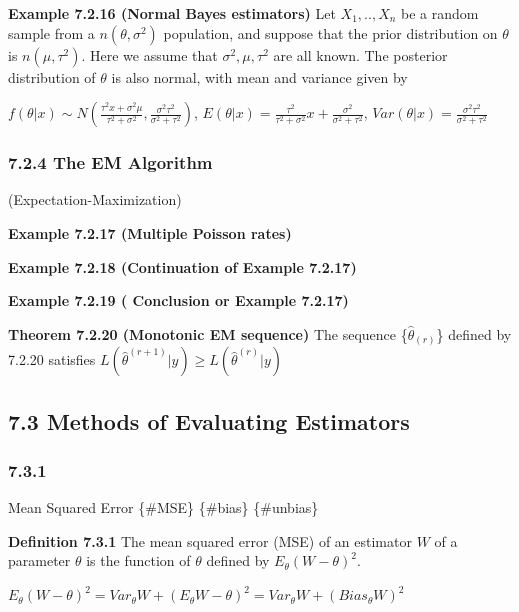 \documentclass[10pt,twocolumn,portrait]{article}
\begin{document}
\textbf{Example 7.2.16 (Normal Bayes estimators)} Let \(X_1,..,X_n\) be
a random sample from a \(n(\theta,\sigma^2)\) population, and suppose
that the prior distribution on \(\theta\) is \(n(\mu,\tau^2)\). Here we
assume that \(\sigma^2, \mu, \tau^2\) are all known. The posterior
distribution of \(\theta\) is also normal, with mean and variance given
by

\(f(\theta|x)\sim N(\frac{\tau^2x+\sigma^2\mu}{\tau^2+\sigma^2},\frac{\sigma^2\tau^2}{\sigma^2+\tau^2})\),
\(E(\theta|x)=\frac{\tau^2}{\tau^2+\sigma^2}x+\frac{\sigma^2}{\sigma^2+\tau^2}\),
\(Var(\theta|x)=\frac{\sigma^2\tau^2}{\sigma^2+\tau^2}\)

\hypertarget{the-em-algorithm}{%
\subsubsection{7.2.4 The EM Algorithm}\label{the-em-algorithm}}

(Expectation-Maximization)

\textbf{Example 7.2.17 (Multiple Poisson rates)}

\textbf{Example 7.2.18 (Continuation of Example 7.2.17)}

\textbf{Example 7.2.19 ( Conclusion or Example 7.2.17)}

\textbf{Theorem 7.2.20 (Monotonic EM sequence)} The sequence
\{\(\hat\theta_{(r)}\)\} defined by 7.2.20 satisfies
\(L\left(\hat\theta^{(r+1)}|y\right)\ge L\left(\hat\theta^{(r)}|y\right)\)

\hypertarget{methods-of-evaluating-estimators}{%
\subsection{7.3 Methods of Evaluating
Estimators}\label{methods-of-evaluating-estimators}}

\hypertarget{section-4}{%
\subsubsection{7.3.1}\label{section-4}}

Mean Squared Error \{\#MSE\} \{\#bias\} \{\#unbias\}

\textbf{Definition 7.3.1} The mean squared error (MSE) of an estimator
\(W\) of a parameter \(\theta\) is the function of \(\theta\) defined by
\(E_{\theta}(W-\theta)^2\).

\(E_{\theta}(W-\theta)^2=Var_{\theta}W+(E_{\theta}W-\theta)^2=Var_{\theta}W+(Bias_{\theta}W)^2\)
\end{document}
